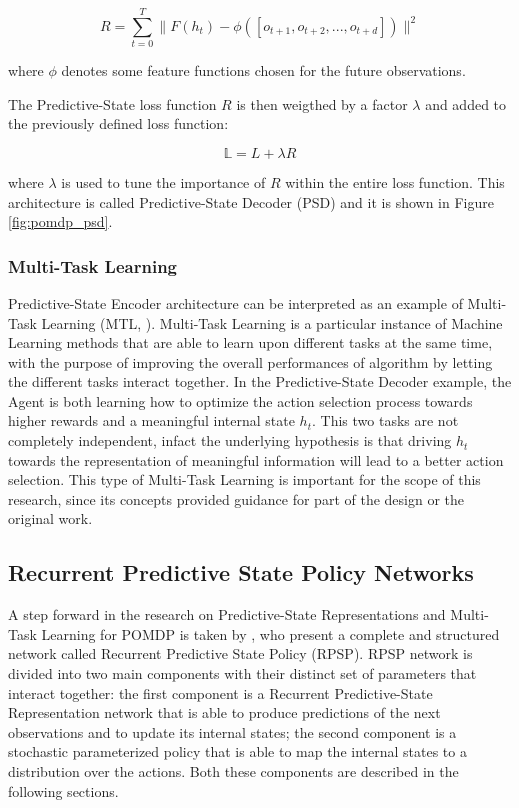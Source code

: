                 \begin{definition}
                    \[ R = \sum_{t=0}^{T} \| F(h_t) - \phi([o_{t+1}, o_{t+2}, ..., o_{t+d}])\|^{2}\]
                    
                    where $\phi$ denotes some feature functions chosen for the future observations.
                \end{definition}
                
                \noindent
                The Predictive-State loss function $R$ is then weigthed by a factor $\lambda$ and added to the previously defined loss function:
                
                \[ \mathbb{L} = L + \lambda R\]
                
                where $\lambda$ is used to tune the importance of $R$ within the entire loss function. This architecture is called Predictive-State Decoder (PSD) and it is shown in Figure \ref{fig:pomdp_psd}. 
            
            \subsubsection{Multi-Task Learning}
                Predictive-State Encoder architecture can be interpreted as an example of Multi-Task Learning (MTL, ). Multi-Task Learning is a particular instance of Machine Learning methods that are able to learn upon different tasks at the same time, with the purpose of improving the overall performances of algorithm by letting the different tasks interact together. In the Predictive-State Decoder example, the Agent is both learning how to optimize the action selection process towards higher rewards and a meaningful internal state $h_t$. This two tasks are not completely independent, infact the underlying hypothesis is that driving $h_t$ towards the representation of meaningful information will lead to a better action selection. This type of Multi-Task Learning is important for the scope of this research, since its concepts provided guidance for part of the design or the original work.
        
        \newpage
        \subsection{Recurrent Predictive State Policy Networks}
        \label{subs:rpsp}
            A step forward in the research on Predictive-State Representations and Multi-Task Learning for POMDP is taken by , who present a complete and structured network called Recurrent Predictive State Policy (RPSP). \newline
            RPSP network is divided into two main components with their distinct set of parameters that interact together: the first component is a Recurrent Predictive-State Representation network that is able to produce predictions of the next observations and to update its internal states; the second component is a stochastic parameterized policy that is able to map the internal states to a distribution over the actions. Both these components are described in the following sections.
            
